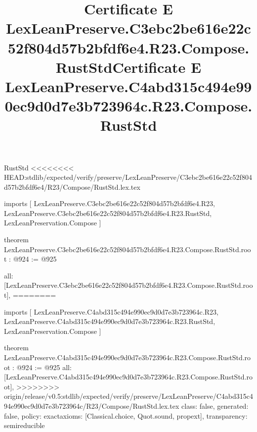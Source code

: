 \begin{lexlean}{RustStd}
<<<<<<<< HEAD:stdlib/expected/verify/preserve/LexLeanPreserve/C3ebc2be616e22c52f804d57b2bfdf6e4/R23/Compose/RustStd.lex.tex
\title{Certificate E LexLeanPreserve.C3ebc2be616e22c52f804d57b2bfdf6e4.R23.Compose.RustStd}
\begin{coremodule}
imports [
  LexLeanPreserve.C3ebc2be616e22c52f804d57b2bfdf6e4.R23,
  LexLeanPreserve.C3ebc2be616e22c52f804d57b2bfdf6e4.R23.RustStd,
  LexLeanPreservation.Compose
]

theorem LexLeanPreserve.C3ebc2be616e22c52f804d57b2bfdf6e4.R23.Compose.RustStd.root : @924 := @925 {
  all: [LexLeanPreserve.C3ebc2be616e22c52f804d57b2bfdf6e4.R23.Compose.RustStd.root],
========
\title{Certificate E LexLeanPreserve.C4abd315c494e990ec9d0d7e3b723964c.R23.Compose.RustStd}
\begin{coremodule}
imports [
  LexLeanPreserve.C4abd315c494e990ec9d0d7e3b723964c.R23,
  LexLeanPreserve.C4abd315c494e990ec9d0d7e3b723964c.R23.RustStd,
  LexLeanPreservation.Compose
]

theorem LexLeanPreserve.C4abd315c494e990ec9d0d7e3b723964c.R23.Compose.RustStd.root : @924 := @925 {
  all: [LexLeanPreserve.C4abd315c494e990ec9d0d7e3b723964c.R23.Compose.RustStd.root],
>>>>>>>> origin/release/v0.5:stdlib/expected/verify/preserve/LexLeanPreserve/C4abd315c494e990ec9d0d7e3b723964c/R23/Compose/RustStd.lex.tex
  class: false,
  generated: false,
  policy: exact{axioms: [Classical.choice, Quot.sound, propext]},
  transparency: semireducible
}


\end{coremodule}}
\end{coremodule}
\end{lexlean}
